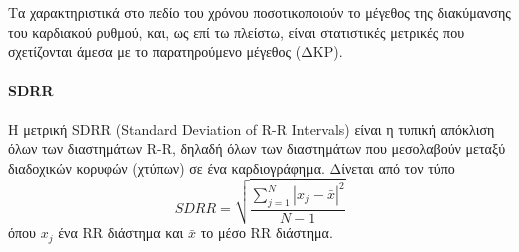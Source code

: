 Τα χαρακτηριστικά στο πεδίο του χρόνου ποσοτικοποιούν το μέγεθος της διακύμανσης του καρδιακού ρυθμού, και, ως επί τω πλείστω, είναι στατιστικές μετρικές που σχετίζονται άμεσα με το παρατηρούμενο μέγεθος (ΔΚΡ).


\paragraph{SDRR}
Η μετρική SDRR (Standard Deviation of R-R Intervals) είναι η τυπική απόκλιση όλων των διαστημάτων  R-R, δηλαδή όλων των διαστημάτων που μεσολαβούν μεταξύ διαδοχικών κορυφών (χτύπων) σε ένα καρδιογράφημα. Δίνεται από τον τύπο
\begin{equation}
\label{eq:SDRR}
   SDRR=\sqrt{\frac{\sum_{j=1}^{N} |x_j-\bar{x}|^2 }{N-1}}
\end{equation}
όπου $x_j$ ένα RR διάστημα και $\bar{x}$ το μέσο RR διάστημα.
